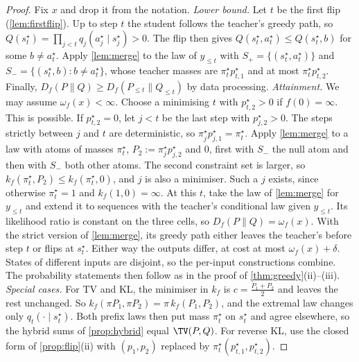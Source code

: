 \begin{proof}
Fix $x$ and drop it from the notation.
\emph{Lower bound.} Let $t$ be the first flip (\cref{lem:firstflip}). Up to step $t$ the student follows the
teacher's greedy path, so $Q(s^\star_t)=\prod_{j<t}q_j(a^\star_j\mid s^\star_j)>0$. The flip then gives
$Q(s^\star_t,a^\star_t)\le Q(s^\star_t,b)$ for some $b\ne a^\star_t$. Apply \cref{lem:merge} to the law of $y_{\le t}$ with
$S_+=\{(s^\star_t,a^\star_t)\}$ and $S_-=\{(s^\star_t,b):b\ne a^\star_t\}$, whose teacher masses are $\pi^\star_tp^\star_{t,1}$ and at most
$\pi^\star_tp^\star_{t,2}$. Finally, $D_f(P\|Q)\ge D_f(P_{\le t}\|Q_{\le t})$ by data processing.
\emph{Attainment.} We may assume $\omega_f(x)<\infty$. Choose a minimising $t$ with $p^\star_{t,2}>0$ if $f(0)=\infty$.
This is possible. If $p^\star_{t,2}=0$, let $j<t$ be the last step with $p^\star_{j,2}>0$. The steps strictly
between $j$ and $t$ are deterministic, so $\pi^\star_jp^\star_{j,1}=\pi^\star_t$. Apply \cref{lem:merge} to a law with atoms
of masses $\pi^\star_t$, $P_2:=\pi^\star_jp^\star_{j,2}$ and $0$, first with $S_-$ the null atom and then with $S_-$ both other
atoms. The second constraint set is larger, so $k_f(\pi^\star_t,P_2)\le k_f(\pi^\star_t,0)$, and $j$ is also a
minimiser. Such a $j$ exists, since otherwise $\pi^\star_t=1$ and $k_f(1,0)=\infty$. At this $t$, take the law of \cref{lem:merge} for $y_{\le t}$ and extend it
to sequences with the teacher's conditional law given $y_{\le t}$. Its likelihood ratio is constant on the three
cells, so $D_f(P\|Q)=\omega_f(x)$. With the strict version of \cref{lem:merge}, its greedy path either leaves
the teacher's before step $t$ or flips at $s^\star_t$. Either way the outputs differ, at cost at most
$\omega_f(x)+\delta$. States of different inputs are disjoint, so the per-input constructions combine. The
probability statements then follow as in the proof of \cref{thm:greedy}(ii)--(iii).
\emph{Special cases.} For TV and KL, the minimiser in $k_f$ is $c=\frac{P_1+P_2}2$ and leaves the rest unchanged.
So $k_f(\pi P_1,\pi P_2)=\pi\,k_f(P_1,P_2)$, and the extremal law changes only $q_t(\cdot\mid s^\star_t)$. Both prefix laws
then put mass $\pi^\star_t$ on $s^\star_t$ and agree elsewhere, so the hybrid sums of \cref{prop:hybrid} equal
$\TV(P,Q)$. For reverse KL, use the closed form of \cref{prop:flip}(ii) with $(p_1,p_2)$ replaced by
$\pi^\star_t(p^\star_{t,1},p^\star_{t,2})$.
\end{proof}

